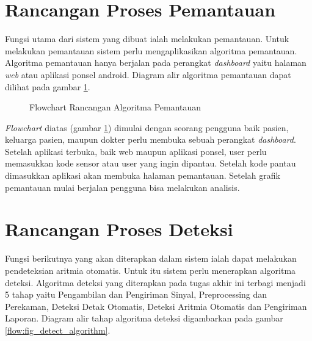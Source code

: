 \section{Rancangan Proses Pemantauan} \label{ssec:algorithm_design_1}
Fungsi utama dari sistem yang dibuat ialah melakukan pemantauan. Untuk melakukan pemantauan sistem perlu mengaplikasikan algoritma pemantauan. Algoritma pemantauan hanya berjalan pada perangkat \textit{dashboard} yaitu halaman \textit{web} atau aplikasi ponsel android. Diagram alir algoritma pemantauan dapat dilihat pada gambar \ref{flow:fig_report_algorithm}.
\begin{figure}[H]
	\centering
    \caption{Flowchart Rancangan Algoritma Pemantauan}
	\label{flow:fig_report_algorithm}
\end{figure}

\textit{Flowchart} diatas (gambar \ref{flow:fig_report_algorithm}) dimulai dengan seorang pengguna baik pasien, keluarga pasien, maupun dokter perlu membuka sebuah perangkat \textit{dashboard}. Setelah aplikasi terbuka, baik web maupun aplikasi ponsel, user perlu memasukkan kode sensor atau user yang ingin dipantau. Setelah kode pantau dimasukkan aplikasi akan membuka halaman pemantauan. Setelah grafik pemantauan mulai berjalan pengguna bisa melakukan analisis.

\section{Rancangan Proses Deteksi} \label{ssec:algorithm_design_2}
Fungsi berikutnya yang akan diterapkan dalam sistem ialah dapat melakukan pendeteksian aritmia otomatis. Untuk itu sistem perlu menerapkan algoritma deteksi. Algoritma deteksi yang diterapkan pada tugas akhir ini terbagi menjadi 5 tahap yaitu Pengambilan dan Pengiriman Sinyal, Preprocessing dan Perekaman, Deteksi Detak Otomatis, Deteksi Aritmia Otomatis dan Pengiriman Laporan. Diagram alir tahap algoritma deteksi digambarkan pada gambar \ref{flow:fig_detect_algorithm}.

